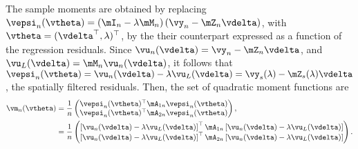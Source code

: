 
The sample moments are obtained by replacing $\vepsi_n(\vtheta) = \left(\mI_n - \lambda\mM_n\right)\left(\vy_n - \mZ_n\vdelta\right)$, with $\vtheta = (\vdelta^\top, \lambda)^\top$, by the their counterpart expressed as a function of the regression residuals. Since $\vu_n(\vdelta) = \vy_n - \mZ_n\vdelta$, and $\vu_L(\vdelta) = \mM_n\vu_n(\vdelta)$, it follows that $\vepsi_n(\vtheta) = \vu_n(\vdelta) - \lambda \vu_L(\vdelta) = \vy_{s}(\lambda) - \mZ_s(\lambda)\vdelta$, the spatially filtered residuals. Then, the set of quadratic moment functions are
\begin{equation}\label{eq:moment_conditions_reduced_u}
\begin{aligned}
\vm_n(\vtheta) & = \frac{1}{n}\begin{pmatrix}
\vepsi_n(\vtheta)^\top\mA_{1n}\vepsi_n(\vtheta) \\
\vepsi_n(\vtheta)^\top\mA_{2n}\vepsi_n(\vtheta)
                              \end{pmatrix}, \\
              & = \frac{1}{n}\begin{pmatrix}
              \left[\vu_n(\vdelta) - \lambda \vu_L(\vdelta)\right]^\top \mA_{1n} \left[\vu_n(\vdelta) - \lambda \vu_L(\vdelta)\right] \\
              \left[\vu_n(\vdelta) - \lambda \vu_L(\vdelta)\right]^\top \mA_{2n} \left[\vu_n(\vdelta) - \lambda \vu_L(\vdelta)\right]
                 \end{pmatrix}.
\end{aligned}
\end{equation}


